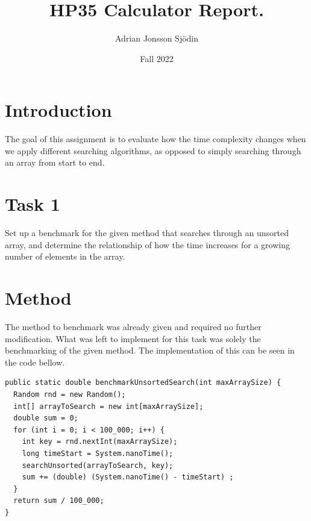 \documentclass[a4paper,11pt]{article}
\begin{document}
\title{
  \textbf{HP35 Calculator Report.}
}
\author{Adrian Jonsson Sjödin}
\date{Fall 2022}

\maketitle

\section*{Introduction}
The goal of this assignment is to evaluate how the time complexity changes when we apply different searching algorithms, as opposed to simply
searching through an array from start to end.
\section*{Task 1}

Set up a benchmark for the given method that searches through an unsorted array, and determine the relationship of how the time increases for a 
growing number of elements in the array. 

\section*{Method}

The method to benchmark was already given and required no further modification. What was left to implement for this task was solely the benchmarking 
of the given method. The implementation of this can be seen in the code bellow.

\begin{verbatim}
public static double benchmarkUnsortedSearch(int maxArraySize) {
  Random rnd = new Random();
  int[] arrayToSearch = new int[maxArraySize];
  double sum = 0;
  for (int i = 0; i < 100_000; i++) {
    int key = rnd.nextInt(maxArraySize);
    long timeStart = System.nanoTime();
    searchUnsorted(arrayToSearch, key);
    sum += (double) (System.nanoTime() - timeStart) ;
  }
  return sum / 100_000;
}
\end{verbatim}
\end{document}
